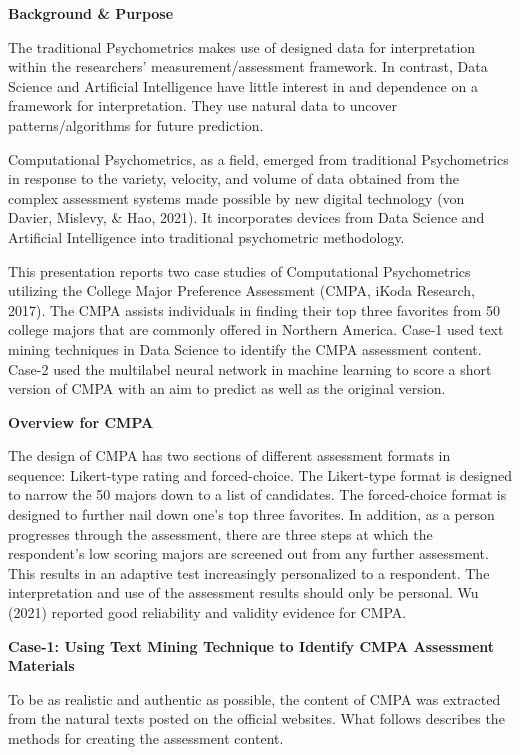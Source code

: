 \documentclass[
]{book}
\begin{document}
\textbf{Background \& Purpose}

The traditional Psychometrics makes use of designed data for interpretation within the researchers' measurement/assessment framework. In contrast, Data Science and Artificial Intelligence have little interest in and dependence on a framework for interpretation. They use natural data to uncover patterns/algorithms for future prediction.

Computational Psychometrics, as a field, emerged from traditional Psychometrics in response to the variety, velocity, and volume of data obtained from the complex assessment systems made possible by new digital technology (von Davier, Mislevy, \& Hao, 2021). It incorporates devices from Data Science and Artificial Intelligence into traditional psychometric methodology.

This presentation reports two case studies of Computational Psychometrics utilizing the College Major Preference Assessment (CMPA, iKoda Research, 2017). The CMPA assists individuals in finding their top three favorites from 50 college majors that are commonly offered in Northern America. Case-1 used text mining techniques in Data Science to identify the CMPA assessment content. Case-2 used the multilabel neural network in machine learning to score a short version of CMPA with an aim to predict as well as the original version.

\textbf{Overview for CMPA}

The design of CMPA has two sections of different assessment formats in sequence: Likert-type rating and forced-choice. The Likert-type format is designed to narrow the 50 majors down to a list of candidates. The forced-choice format is designed to further nail down one's top three favorites. In addition, as a person progresses through the assessment, there are three steps at which the respondent's low scoring majors are screened out from any further assessment. This results in an adaptive test increasingly personalized to a respondent. The interpretation and use of the assessment results should only be personal. Wu (2021) reported good reliability and validity evidence for CMPA.

\textbf{Case-1: Using Text Mining Technique to Identify CMPA Assessment Materials}

To be as realistic and authentic as possible, the content of CMPA was extracted from the natural texts posted on the official websites. What follows describes the methods for creating the assessment content.
\end{document}
